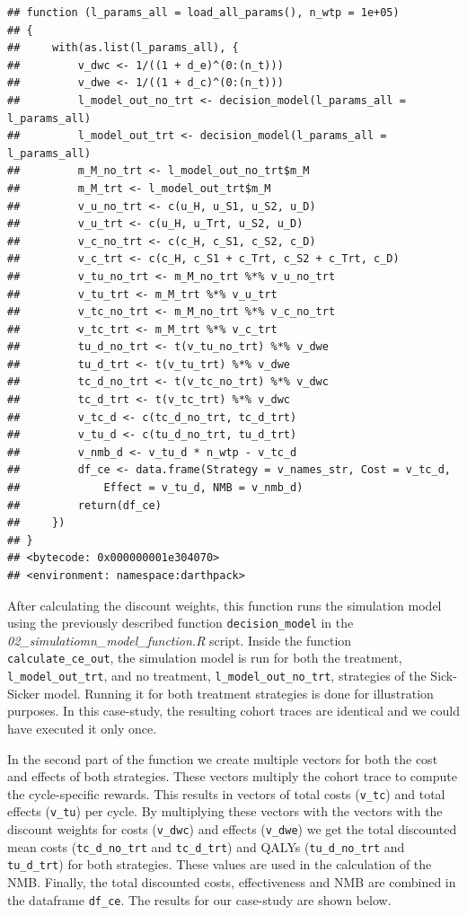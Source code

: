 \documentclass[]{book}
\begin{document}
\begin{verbatim}
## function (l_params_all = load_all_params(), n_wtp = 1e+05) 
## {
##     with(as.list(l_params_all), {
##         v_dwc <- 1/((1 + d_e)^(0:(n_t)))
##         v_dwe <- 1/((1 + d_c)^(0:(n_t)))
##         l_model_out_no_trt <- decision_model(l_params_all = l_params_all)
##         l_model_out_trt <- decision_model(l_params_all = l_params_all)
##         m_M_no_trt <- l_model_out_no_trt$m_M
##         m_M_trt <- l_model_out_trt$m_M
##         v_u_no_trt <- c(u_H, u_S1, u_S2, u_D)
##         v_u_trt <- c(u_H, u_Trt, u_S2, u_D)
##         v_c_no_trt <- c(c_H, c_S1, c_S2, c_D)
##         v_c_trt <- c(c_H, c_S1 + c_Trt, c_S2 + c_Trt, c_D)
##         v_tu_no_trt <- m_M_no_trt %*% v_u_no_trt
##         v_tu_trt <- m_M_trt %*% v_u_trt
##         v_tc_no_trt <- m_M_no_trt %*% v_c_no_trt
##         v_tc_trt <- m_M_trt %*% v_c_trt
##         tu_d_no_trt <- t(v_tu_no_trt) %*% v_dwe
##         tu_d_trt <- t(v_tu_trt) %*% v_dwe
##         tc_d_no_trt <- t(v_tc_no_trt) %*% v_dwc
##         tc_d_trt <- t(v_tc_trt) %*% v_dwc
##         v_tc_d <- c(tc_d_no_trt, tc_d_trt)
##         v_tu_d <- c(tu_d_no_trt, tu_d_trt)
##         v_nmb_d <- v_tu_d * n_wtp - v_tc_d
##         df_ce <- data.frame(Strategy = v_names_str, Cost = v_tc_d, 
##             Effect = v_tu_d, NMB = v_nmb_d)
##         return(df_ce)
##     })
## }
## <bytecode: 0x000000001e304070>
## <environment: namespace:darthpack>
\end{verbatim}

After calculating the discount weights, this function runs the simulation model using the previously described function \texttt{decision\_model} in the \emph{02\_simulatiomn\_model\_function.R} script. Inside the function \texttt{calculate\_ce\_out}, the simulation model is run for both the treatment, \texttt{l\_model\_out\_trt}, and no treatment, \texttt{l\_model\_out\_no\_trt}, strategies of the Sick-Sicker model. Running it for both treatment strategies is done for illustration purposes. In this case-study, the resulting cohort traces are identical and we could have executed it only once.

In the second part of the function we create multiple vectors for both the cost and effects of both strategies. These vectors multiply the cohort trace to compute the cycle-specific rewards. This results in vectors of total costs (\texttt{v\_tc}) and total effects (\texttt{v\_tu}) per cycle. By multiplying these vectors with the vectors with the discount weights for costs (\texttt{v\_dwc}) and effects (\texttt{v\_dwe}) we get the total discounted mean costs (\texttt{tc\_d\_no\_trt} and \texttt{tc\_d\_trt}) and QALYs (\texttt{tu\_d\_no\_trt} and \texttt{tu\_d\_trt}) for both strategies. These values are used in the calculation of the NMB. Finally, the total discounted costs, effectiveness and NMB are combined in the dataframe \texttt{df\_ce}. The results for our case-study are shown below.
\end{document}
